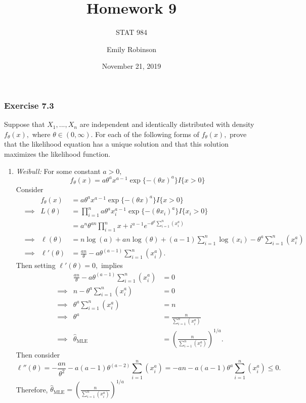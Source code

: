 \documentclass[12pt,]{article}
\title{Homework 9}
\subtitle{STAT 984}
\author{Emily Robinson}
\date{November 21, 2019}
\begin{document}
\maketitle

\hypertarget{exercise-7.3}{%
\subsubsection{Exercise 7.3}\label{exercise-7.3}}

Suppose that \(X_1, ..., X_n\) are independent and identically
distributed with density \(f_\theta(x),\) where
\(\theta \in (0,\infty).\) For each of the following forms of
\(f_\theta(x),\) prove that the likelihood equation has a unique
solution and that this solution maximizes the likelihood function.

\begin{enumerate}
\def\labelenumi{(\alph{enumi})}
\item
  \textit{Weibull:} For some constant \(a>0,\)
  \[f_\theta(x)=a\theta^ax^{a-1}\exp\{-(\theta x)^a\}I\{x>0\}\] Consider
  \begin{align*}
  &&f_\theta(x)&=a\theta^ax^{a-1}\exp\{-(\theta x)^a\}I\{x>0\}\\
  &\implies& L(\theta)&=\prod_{i=1}^n a\theta^ax_i^{a-1}\exp\{-(\theta x_i)^a\}I\{x_i>0\}\\
  &&&=a^n\theta^{an}\prod_{i=1}^nx+i^{a-1} e^{-\theta^a\sum_{i=1}^n(x_i^a)}\\
  &\implies&\ell(\theta) &=n\log(a)+an\log(\theta)+(a-1)\sum_{i=1}^n\log(x_i)-\theta^a\sum_{i=1}^n(x_i^a)\\
  &\implies&\ell'(\theta)&=\frac{an}{\theta}-a\theta^{(a-1)}\sum_{i=1}^n(x_i^a).
  \end{align*} Then setting \(\ell'(\theta)=0,\) implies \begin{align*}
  &&\frac{an}{\theta}-a\theta^{(a-1)}\sum_{i=1}^n(x_i^a) & = 0\\
  &\implies& n-\theta^a\sum_{i=1}^n(x_i^a) & = 0\\
  &\implies& \theta^a\sum_{i=1}^n(x_i^a) & = n\\
  &\implies& \theta^a & = \frac{n}{\sum_{i=1}^n(x_i^a)}\\
  &\implies& \hat{\theta}_{\text{MLE}} & = \left(\frac{n}{\sum_{i=1}^n(x_i^a)}\right)^{1/a}.
  \end{align*} Then consider
  \[\ell''(\theta)=-\frac{an}{\theta^2}-a(a-1)\theta^{(a-2)}\sum_{i=1}^n(x_i^a)= -an-a(a-1)\theta^a\sum_{i=1}^n(x_i^a)\le 0.\]
  Therefore,
  \(\hat{\theta}_{\text{MLE}} = \left(\frac{n}{\sum_{i=1}^n(x_i^a)}\right)^{1/a}\)

\end{enumerate}
\end{document}
